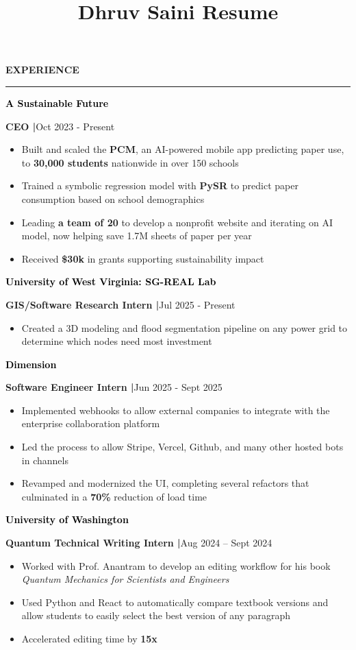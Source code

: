 \documentclass[8pt,a4paper]{altacv}
\title{Dhruv Saini Resume}
\makeatletter
\newcommand{\resumebodysize}{\fontsize{8pt}{9pt}\selectfont}
\renewcommand{\divider}{\textcolor{body!30}{\hdashrule{\linewidth}{0.6pt}{0.285em}}\vspace{4.096pt}}
\renewcommand{\makecvheader}{%
  \begingroup
    \raggedright\color{emphasis}%
    {\Huge\bfseries\MakeUppercase{\@name}\par}
    \vspace{4.3pt}
    {\small\bfseries\@personalinfo\par}
  \endgroup
}
\renewcommand{\cvsection}[2][]{%
  \bigskip%
  \vspace{3.686pt}%
  \ifstrequal{#1}{}{}{\marginpar{\vspace*{\dimexpr1pt-\baselineskip}\raggedright}}%
  {\color{heading}\large\bfseries\MakeUppercase{#2}}\\[-1ex]\vspace{1.489pt}%
  {\color{heading}\rule{\linewidth}{2pt}\par}\medskip\vspace{1.179pt}
}
\renewcommand{\cvevent}[4]{%
  {\fontsize{9pt}{9pt}\selectfont\color{black}\hspace*{-0.282pt}#1\par}
  \ifstrequal{#2}{}{}{%
    \vspace{2.144pt}
    {\fontsize{9pt}{9pt}\selectfont\textbf{\color{accent}#2}\hspace{0.5em}\resumebodysize\faCalendar\hspace{0.5em}#3\par}%
  }%
  \vspace{2.145pt}\resumebodysize
}
\makeatother
\begin{document}
\makecvheader
\vskip0.917pt
\resumebodysize

\cvsection{Experience}
\vskip0.464pt

\cvevent{\textcolor{black}{\textbf{A Sustainable Future}}}{\textnormal{CEO |}}{Oct 2023 - Present}{}
\begin{itemize}
\item Built and scaled the \textbf{PCM}, an AI-powered mobile app predicting paper use, to \textbf{30,000 students} nationwide in over 150 schools
\item Trained a symbolic regression model with \textbf{PySR} to predict paper consumption based on school demographics
\item Leading \textbf{a team of 20} to develop a nonprofit website and iterating on AI model, now helping save 1.7M sheets of paper per year
\item Received \textbf{\$30k} in grants supporting sustainability impact
\end{itemize}
\divider

\cvevent{\textcolor{black}{\textbf{University of West Virginia: SG-REAL Lab}}}{\textnormal{GIS/Software Research Intern |}}{Jul 2025 - Present}{}
\begin{itemize}
\item Created a 3D modeling and flood segmentation pipeline on any power grid to determine which nodes need most investment
\end{itemize}
\divider

\cvevent{\textcolor{black}{\textbf{Dimension}}}{\textnormal{Software Engineer Intern |}}{Jun 2025 - Sept 2025}{}
\begin{itemize}
\item Implemented webhooks to allow external companies to integrate with the enterprise collaboration platform
\item Led the process to allow Stripe, Vercel, Github, and many other hosted bots in channels
\item Revamped and modernized the UI, completing several refactors that culminated in a \textbf{70\%} reduction of load time
\end{itemize}
\divider

\cvevent{\textcolor{black}{\textbf{University of Washington}}}{\textnormal{Quantum Technical Writing Intern |}}{Aug 2024 – Sept 2024}{}
\begin{itemize}
\item Worked with Prof. Anantram to develop an editing workflow for his book \textit{Quantum Mechanics for Scientists and Engineers}
\item Used Python and React to automatically compare textbook versions and allow students to easily select the best version of any paragraph
\item Accelerated editing time by \textbf{15x}
\end{itemize}
\end{document}
